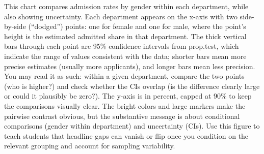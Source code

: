 \documentclass[
  letterpaper,
  DIV=11,
  numbers=noendperiod]{scrreprt}
\begin{document}
This chart compares admission rates by gender within each department,
while also showing uncertainty. Each department appears on the x-axis
with two side-by-side (``dodged'') points: one for female and one for
male, where the point's height is the estimated admitted share in that
department. The thick vertical bars through each point are 95\%
confidence intervals from prop.test, which indicate the range of values
consistent with the data; shorter bars mean more precise estimates
(usually more applicants), and longer bars mean less precision. You may
read it as such: within a given department, compare the two points (who
is higher?) and check whether the CIs overlap (is the difference clearly
large or could it plausibly be zero?). The y-axis is in percent, capped
at 90\% to keep the comparisons visually clear. The bright colors and
large markers make the pairwise contrast obvious, but the substantive
message is about conditional comparisons (gender within department) and
uncertainty (CIs). Use this figure to teach students that headline gaps
can vanish or flip once you condition on the relevant grouping and
account for sampling variability.
\end{document}
